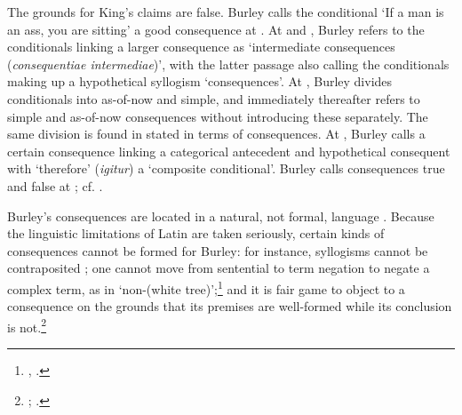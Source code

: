 {		The grounds for King's claims are false. Burley calls the conditional `If a man is an ass, you are sitting' a good consequence at \autocite[p. 61]{BurleyDPAL}. At \autocite[p. 114, par. 8]{Green-Pedersen1980b} and \autocite[p. 89.1-31]{BurleyDPAL}, Burley refers to the conditionals linking a larger consequence as `intermediate consequences (\textit{consequentiae intermediae})', with the latter passage also calling the conditionals making up a hypothetical syllogism `consequences'. At \autocite[p. 128, par. 68]{Green-Pedersen1980b}, Burley divides conditionals into as-of-now and simple, and immediately thereafter refers to simple and as-of-now consequences without introducing these separately. The same division is found in \autocite[pp. 60.28-61.5]{BurleyDPAL} stated in terms of consequences. At \autocite[p. 78.27-30]{BurleyDPAL}, Burley calls a certain consequence linking a categorical antecedent and hypothetical consequent with `therefore' (\textit{igitur}) a `composite conditional'. Burley calls consequences true and false at \autocite[p. 113, par. 2-3]{Green-Pedersen1980b}; cf. \autocite[p. 15, par. 19]{Green-Pedersen1980a}.} 
	
	Burley's consequences are located in a natural, not formal, language \autocite[pp. 4-5]{HodgesBurley}. Because the linguistic limitations of Latin are taken seriously, certain kinds of consequences cannot be formed for Burley: for instance, syllogisms cannot be contraposited \autocite[pp. 65.3-17; 207.31-208.9]{BurleyDPAL}; one cannot move from sentential to term negation to negate a complex term, as in `non-(white tree)';\footnote{\cite[p. 131, par. 80]{Green-Pedersen1980b}, \cite[pp. 214.14-21, 215.6-21]{BurleyDPAL}.} and it is fair game to object to a consequence on the grounds that its premises are well-formed while its conclusion is not.\footnote{\cite[p. 150, par. 135]{Green-Pedersen1980b}; \cite[pp. 211.31-33, 212.10-20]{BurleyDPAL}.}
	
